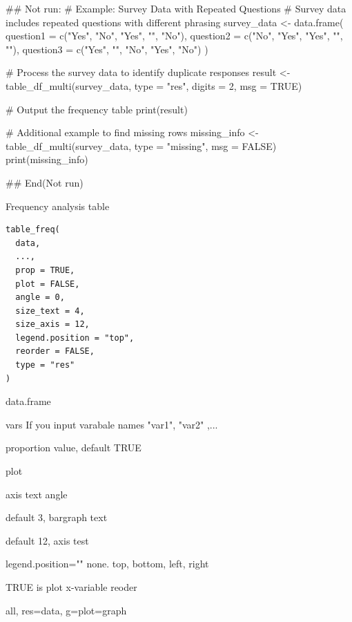 \documentclass[a4paper]{book}
\begin{document}
\begin{Examples}
\begin{ExampleCode}
## Not run: 
# Example: Survey Data with Repeated Questions
# Survey data includes repeated questions with different phrasing
survey_data <- data.frame(
  question1 = c("Yes", "No", "Yes", "", "No"),
  question2 = c("No", "Yes", "Yes", "", ""),
  question3 = c("Yes", "", "No", "Yes", "No")
)

# Process the survey data to identify duplicate responses
result <- table_df_multi(survey_data, type = "res", digits = 2, msg = TRUE)

# Output the frequency table
print(result)

# Additional example to find missing rows
missing_info <- table_df_multi(survey_data, type = "missing", msg = FALSE)
print(missing_info)

## End(Not run)
\end{ExampleCode}
\end{Examples}
%
\begin{Description}
Frequency analysis table
\end{Description}
%
\begin{Usage}
\begin{verbatim}
table_freq(
  data,
  ...,
  prop = TRUE,
  plot = FALSE,
  angle = 0,
  size_text = 4,
  size_axis = 12,
  legend.position = "top",
  reorder = FALSE,
  type = "res"
)
\end{verbatim}
\end{Usage}
%
\begin{Arguments}
\begin{ldescription}
\item[\code{data}] data.frame

\item[\code{...}] vars If you input varabale names "var1", "var2" ,...

\item[\code{prop}] proportion value, default TRUE

\item[\code{plot}] plot

\item[\code{angle}] axis text angle

\item[\code{size\_text}] default 3, bargraph text

\item[\code{size\_axis}] default 12, axis test

\item[\code{legend.position}] legend.position="" none. top, bottom, left, right

\item[\code{reorder}] TRUE is plot x-variable reoder

\item[\code{type}] all, res=data, g=plot=graph
\end{ldescription}
\end{Arguments}
\end{document}
